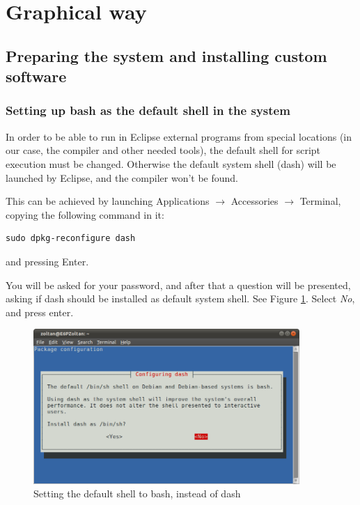 \documentclass[a4paper, 10pt]{article}
\begin{document}
\section{Graphical way}

\subsection{Preparing the system and installing custom software}


\subsubsection{Setting up bash as the default shell in the system}

In order to be able to run in Eclipse external programs from special locations
(in our case, the compiler and other needed tools),
the default shell for script execution must be changed.
Otherwise the default system shell (dash) will be launched by Eclipse,
and the compiler won't be found.

This can be achieved by launching Applications $\rightarrow$ Accessories $\rightarrow$ Terminal,
copying the following command in it:

\begin{verbatim}
sudo dpkg-reconfigure dash
\end{verbatim}

and pressing Enter.

You will be asked for your password,
and after that a question will be presented, asking
if dash should be installed as default system shell.
See Figure \ref{fig:set-dash-default}.
Select \emph{No}, and press enter.

    \begin{figure}[H]
    \centering
        \includegraphics[width=0.9\textwidth]{./install-guide-linux-images/set-dash-default.png}
        \caption{Setting the default shell to bash, instead of dash}
        \label{fig:set-dash-default}
    \end{figure}
\end{document}
